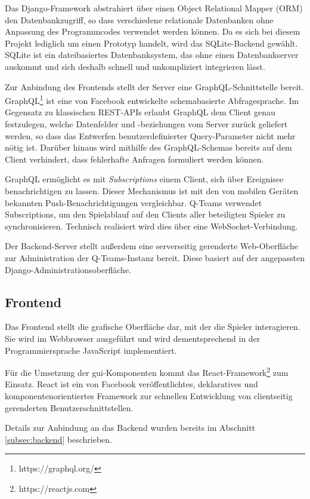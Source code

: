 \documentclass[a4paper,11pt,listof=numbered,glossary=totoc,parskip=half,toc=bib]{scrreprt}
\begin{document}
	Das Django-Framework abstrahiert über einen Object Relational Mapper (ORM) den Datenbankzugriff, so dass verschiedene relationale Datenbanken ohne Anpassung des Programmcodes verwendet werden können. Da es sich bei diesem Projekt lediglich um einen Prototyp handelt, wird das SQLite-Backend gewählt. SQLite ist ein dateibasiertes Datenbanksystem, das ohne einen Datenbankserver auskommt und sich deshalb schnell und unkompliziert integrieren lässt.
	
	Zur Anbindung des Frontends stellt der Server eine GraphQL-Schnittstelle bereit. GraphQL\footnote{https://graphql.org/} ist eine von Facebook entwickelte schemabasierte Abfragesprache. Im Gegensatz zu klassischen REST-APIs erlaubt GraphQL dem Client genau festzulegen, welche Datenfelder und -beziehungen vom Server zurück geliefert werden, so dass das Entwerfen benutzerdefinierter Query-Parameter nicht mehr nötig ist. Darüber hinaus wird mithilfe des GraphQL-Schemas bereits auf dem Client verhindert, dass fehlerhafte Anfragen formuliert werden können.
	
	GraphQL ermöglicht es mit \textit{Subscriptions} einem Client, sich über Ereignisee benachrichtigen zu lassen. Dieser Mechanismus ist mit den von mobilen Geräten bekannten Push-Benachrichtigungen vergleichbar. Q-Teams verwendet Subscriptions, um den Spielablauf auf den Clients aller beteiligten Spieler zu synchronisieren. Technisch realisiert wird dies über eine WebSocket-Verbindung.

	Der Backend-Server stellt außerdem eine serverseitig gerenderte Web-Oberfläche zur Administration der Q-Teams-Instanz bereit. Diese basiert auf der angepassten Django-Administrationsoberfläche.
	
	\subsection{Frontend}
	Das Frontend stellt die grafische Oberfläche dar, mit der die Spieler interagieren. Sie wird im Webbrowser ausgeführt und wird dementsprechend in der Programmiersprache JavaScript implementiert.
	
	 Für die Umsetzung der \Gls{gui}-Komponenten kommt das React-Framework\footnote{https://reactjs.com} zum Einsatz. React ist ein von Facebook veröffentlichtes, deklaratives und komponentenorientiertes Framework zur schnellen Entwicklung von clientseitig gerenderten Benutzerschnittstellen.
	
	Details zur Anbindung an das Backend wurden bereits im Abschnitt \ref{subsec:backend} beschrieben.
\end{document}
